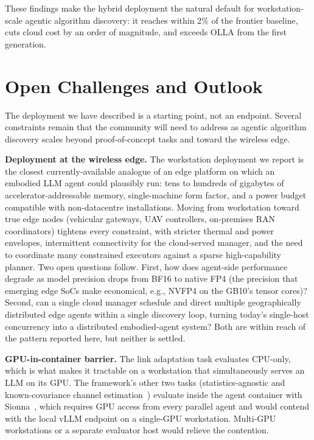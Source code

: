 \documentclass[journal]{IEEEtran}
\begin{document}
These findings make the hybrid deployment the natural default for workstation-scale agentic algorithm discovery: it reaches within 2\% of the frontier baseline, cuts cloud cost by an order of magnitude, and exceeds OLLA from the first generation.

\section{Open Challenges and Outlook}
\label{sec:open}

The deployment we have described is a starting point, not an endpoint. Several constraints remain that the community will need to address as agentic algorithm discovery scales beyond proof-of-concept tasks and toward the wireless edge.

\textbf{Deployment at the wireless edge.} The workstation deployment we report is the closest currently-available analogue of an edge platform on which an embodied LLM agent could plausibly run: tens to hundreds of gigabytes of accelerator-addressable memory, single-machine form factor, and a power budget compatible with non-datacentre installations. Moving from workstation toward true edge nodes (vehicular gateways, UAV controllers, on-premises RAN coordinators) tightens every constraint, with stricter thermal and power envelopes, intermittent connectivity for the cloud-served manager, and the need to coordinate many constrained executors against a sparse high-capability planner. Two open questions follow. First, how does agent-side performance degrade as model precision drops from BF16 to native FP4 (the precision that emerging edge SoCs make economical, e.g., NVFP4 on the GB10's tensor cores)? Second, can a single cloud manager schedule and direct multiple geographically distributed edge agents within a single discovery loop, turning today's single-host concurrency into a distributed embodied-agent system? Both are within reach of the pattern reported here, but neither is settled.

\textbf{GPU-in-container barrier.} The link adaptation task evaluates CPU-only, which is what makes it tractable on a workstation that simultaneously serves an LLM on its GPU. The framework's other two tasks (statistics-agnostic and known-covariance channel estimation~\cite{aitaoudia2026aite}) evaluate inside the agent container with Sionna~\cite{sionna}, which requires GPU access from every parallel agent and would contend with the local vLLM endpoint on a single-GPU workstation. Multi-GPU workstations or a separate evaluator host would relieve the contention.
\end{document}
